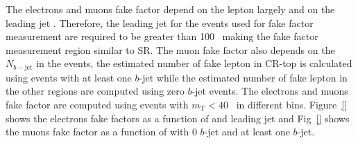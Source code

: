 \begin{table}[htbp]
    \caption{The ID and anti-ID selection criteria for electrons and muons.}
    \label{tab:bkg_ID_anti_ID_selection_criteria}
\end{table}

The electrons and muons fake factor depend on the lepton \pt largely and on the leading jet \pt.
Therefore, the leading jet \pt for the events used for fake factor measurement are required to be greater than 100~{\GeV} making the fake factor measurement region similar to SR.
The muon fake factor also depends on the $N_{b-\mathrm{jet}}$ in the events, the estimated number of fake lepton in CR-top is calculated using events with at least one $b$-jet while the estimated number of fake lepton in the other regions are computed using zero $b$-jet events.
The electrons and muons fake factor are computed using events with $m_\mathrm{T} < 40$~{\GeV} in different \pt bins.
Figure~\ref{} shows the electrons fake factors as a function of \pt and leading jet \pt and Fig~\ref{} shows the muons fake factor as a function of \pt with 0 $b$-jet and at least one $b$-jet.

